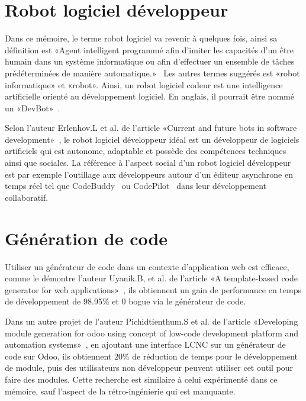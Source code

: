 \label{sec:RevLitt}

\section{Robot logiciel développeur}\label{robot_logiciel_developpeur_revue}

Dans ce mémoire, le terme robot logiciel va revenir à quelques fois, ainsi sa définition est «Agent intelligent programmé afin d'imiter les capacités d'un être humain dans un système informatique ou afin d'effectuer un ensemble de tâches prédéterminées de manière automatique.»~\cite{robot_logiciel_oqlf_2018} Les autres termes suggérés est «robot informatique» et «robot». Ainsi, un robot logiciel codeur est une intelligence artificielle orienté au développement logiciel. En anglais, il pourrait être nommé un «DevBot»~\cite{8823643}.

Selon l'auteur Erlenhov.L et al. de l'article «Current and future bots in software development»~\cite{8823643}, le robot logiciel développeur idéal est un développeur de logiciels artificiels qui est autonome, adaptable et possède des compétences techniques ainsi que sociales. La référence à l'aspect social d'un robot logiciel développeur est par exemple l'outillage aux développeurs autour d'un éditeur asynchrone en temps réel tel que CodeBuddy~\cite{10.1145/3287324.3293750} ou CodePilot~\cite{10.5555/1030453.1030540} dans leur développement collaboratif.

\section{Génération de code}

Utiliser un générateur de code dans un contexte d'application web est efficace, comme le démontre l'auteur Uyanik.B, et al. de l'article «A template-based code generator for web applications»~\cite{SAHIN2020}, ils obtiennent un gain de performance en temps de développement de 98.95\% et 0 bogue via le générateur de code.

Dans un autre projet de l'auteur Pichidtienthum.S et al. de l'article «Developing module generation for odoo using concept of low-code development platform and automation systems»~\cite{9436754}, en ajoutant une interface LCNC sur un générateur de code sur Odoo, ils obtiennent 20\% de réduction de temps pour le développement de module, puis des utilisateurs non développeur peuvent utiliser cet outil pour faire des modules. Cette recherche est similaire à celui expérimenté dans ce mémoire, sauf l'aspect de la rétro-ingénierie qui est manquante.

